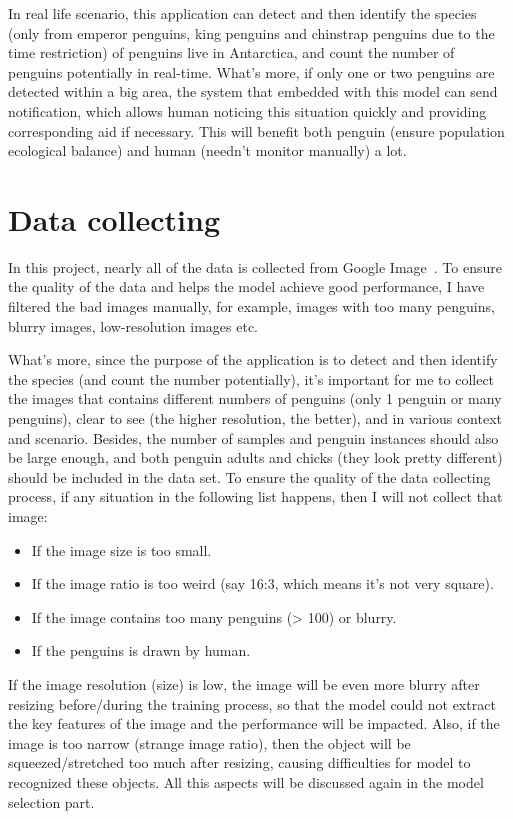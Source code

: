 \documentclass[runningheads]{llncs}
\begin{document}
In real life scenario, this application can detect and then identify the species (only from emperor penguins, king penguins and chinstrap penguins due to the time restriction) of penguins live in Antarctica, and count the number of penguins potentially in real-time. What's more, if only one or two penguins are detected within a big area, the system that embedded with this model can send notification, which allows human noticing this situation quickly and providing corresponding aid if necessary. This will benefit both penguin (ensure population ecological balance) and human (needn't monitor manually) a lot.

\section{Data collecting}
In this project, nearly all of the data is collected from Google Image~\cite{ref_google_image}. To ensure the quality of the data and helps the model achieve good performance, I have filtered the bad images manually, for example, images with too many penguins, blurry images, low-resolution images etc.

What's more, since the purpose of the application is to detect and then identify the species (and count the number potentially), it's important for me to collect the images that contains different numbers of penguins (only 1 penguin or many penguins), clear to see (the higher resolution, the better), and in various context and scenario. Besides, the number of samples and penguin instances should also be large enough, and both penguin adults and chicks (they look pretty different) should be included in the data set. To ensure the quality of the data collecting process, if any situation in the following list happens, then I will not collect that image:

\begin{itemize}
  \item If the image size is too small.
  \item If the image ratio is too weird (say 16:3, which means it's not very square).
  \item If the image contains too many penguins (> 100) or blurry.
  \item If the penguins is drawn by human.
\end{itemize}

If the image resolution (size) is low, the image will be even more blurry after resizing before/during the training process, so that the model could not extract the key features of the image and the performance will be impacted. Also, if the image is too narrow (strange image ratio), then the object will be squeezed/stretched too much after resizing, causing difficulties for model to recognized these objects. All this aspects will be discussed again in the model selection part.
\end{document}

